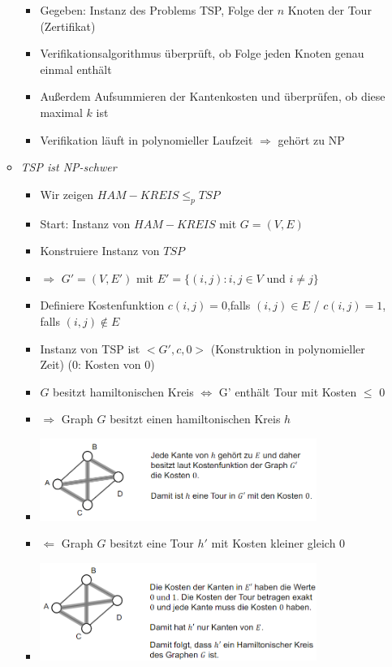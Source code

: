 \documentclass[
    12pt,
    a4paper,
    ngerman,
    color=3b,%
    marginpar=false,
    colorback=false,
    leqno,
]{tudaexercise}
\begin{document}
\begin{itemize}
\begin{itemize}
\begin{itemize}
                        \item Gegeben: Instanz des Problems TSP, Folge der $n$ Knoten der Tour (Zertifikat)
                        \item Verifikationsalgorithmus überprüft, ob Folge jeden Knoten genau einmal enthält
                        \item Außerdem Aufsummieren der Kantenkosten und überprüfen, ob diese maximal $k$ ist
                        \item Verifikation läuft in polynomieller Laufzeit $\Rightarrow$ gehört zu NP
                    \end{itemize}
                    \clearpage
              \item \textit{TSP ist NP-schwer}
                    \begin{itemize}
                        \item Wir zeigen $HAM-KREIS \leq_p TSP$
                        \item Start: Instanz von $HAM-KREIS$ mit $G=(V,E)$
                        \item Konstruiere Instanz von $TSP$
                        \item[] $\Rightarrow$ $G'=(V,E')$ mit $E'=\{(i,j):i,j \in V$ und $i\neq j\}$
                        \item Definiere Kostenfunktion $c(i,j) = 0$,falls $(i,j) \in E$ / $c(i,j)=1$, falls $(i,j) \notin E$
                        \item Instanz von TSP ist $<G', c, 0>$ (Konstruktion in polynomieller Zeit) (0: Kosten von 0)
                        \item {} $G$ besitzt hamiltonischen Kreis $\Leftrightarrow$ G' enthält Tour mit Kosten $\leq$ 0
                        \item $\Rightarrow$ Graph $G$ besitzt einen hamiltonischen Kreis $h$
                        \item[] \includegraphics[width=9cm]{pictures/schwer1.PNG}
                        \item $\Leftarrow$ Graph $G$ besitzt eine Tour $h'$ mit Kosten kleiner gleich 0
                        \item[] \includegraphics[width=9cm]{pictures/schwer2.PNG}
                    \end{itemize}
          \end{itemize}

\end{itemize}
\end{document}
